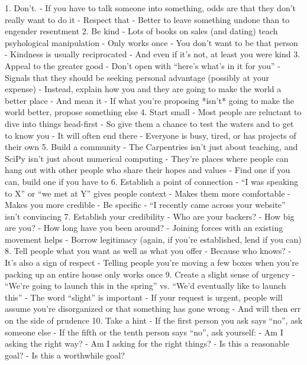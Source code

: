 \documentclass[10pt,letterpaper]{article}
\begin{document}
1.  Don't.
    - If you have to talk someone into something, odds are that they don't really want to do it
    - Respect that
      - Better to leave something undone than to engender resentment
2.  Be kind
    - Lots of books on sales (and dating) teach psyhological manipulation
      - Only works once
      - You don't want to be that person
    - Kindness is usually reciprocated
      - And even if it's not, at least you were kind
3.  Appeal to the greater good
    - Don't open with ``here's what's in it for you''
      - Signals that they should be seeking personal advantage (possibly at your expense)
    - Instead, explain how you and they are going to make the world a better place
    - And mean it
      - If what you're proposing *isn't* going to make the world better, propose something else
4.  Start small
    - Most people are reluctant to dive into things head-first
    - So give them a chance to test the waters and to get to know you
    - It will often end there
      - Everyone is busy, tired, or has projects of their own
5.  Build a community
    - The Carpentries isn't just about teaching, and SciPy isn't just about numerical computing
    - They're places where people can hang out with other people who share their hopes and values
    - Find one if you can, build one if you have to
6.  Establish a point of connection
    - ``I was speaking to X'' or ``we met at Y'' gives people context
      - Makes them more comfortable
      - Makes you more credible
    - Be specific
      - ``I recently came across your website'' isn't convincing
7.  Establish your credibility
    - Who are your backers?
    - How big are you?
    - How long have you been around?
    - Joining forces with an existing movement helps
    - Borrow legitimacy (again, if you're established, lend if you can)
8.  Tell people what you want as well as what you offer
    - Because who knows?
    - It's also a sign of respect
      - Telling people you're moving a few boxes when you're packing up an entire house only works once
9.  Create a slight sense of urgency
    - ``We're going to launch this in the spring'' vs. ``We'd eventually like to launch this''
    - The word ``slight'' is important
      - If your request is urgent, people will assume you're disorganized or that something has gone wrong
      - And will then err on the side of prudence
10. Take a hint
    - If the first person you ask says ``no'', ask someone else
    - If the fifth or the tenth person says ``no'', ask yourself:
      - Am I asking the right way?
      - Am I asking for the right things?
      - Is this a reasonable goal?
      - Is this a worthwhile goal?
\end{document}
